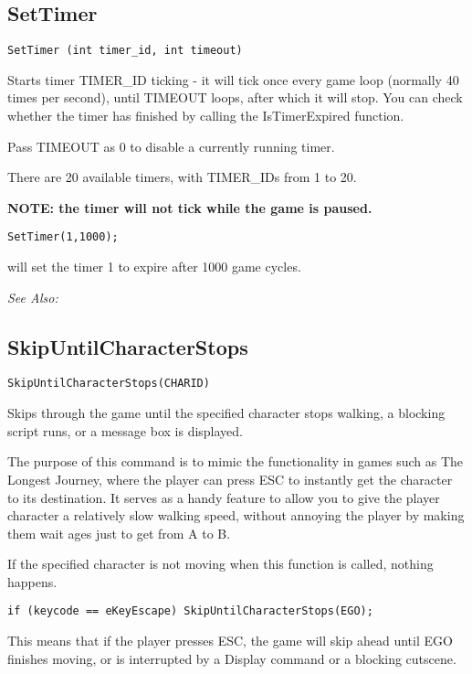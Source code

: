 \subsection{SetTimer}\label{SetTimer}%

\begin{verbatim}
SetTimer (int timer_id, int timeout)
\end{verbatim}
Starts timer TIMER_ID ticking - it will tick once every game loop (normally
40 times per second), until TIMEOUT loops, after which it will stop.
You can check whether the timer has finished by calling the IsTimerExpired
function.

Pass TIMEOUT as 0 to disable a currently running timer.

There are 20 available timers, with TIMER_IDs from 1 to 20.

\bf{NOTE:} the timer will not tick while the game is paused.

\begin{verbatim}
SetTimer(1,1000);
\end{verbatim}
will set the timer 1 to expire after 1000 game cycles.

\it{See Also:} 


\subsection{SkipUntilCharacterStops}\label{SkipUntilCharacterStops}%

\begin{verbatim}
SkipUntilCharacterStops(CHARID)
\end{verbatim}

Skips through the game until the specified character stops walking, a blocking
script runs, or a message box is displayed.

The purpose of this command is to mimic the functionality in games such as The Longest Journey,
where the player can press ESC to instantly get the character to its destination. It serves
as a handy feature to allow you to give the player character a relatively slow walking speed,
without annoying the player by making them wait ages just to get from A to B.

If the specified character is not moving when this function is called, nothing happens.

\begin{verbatim}
if (keycode == eKeyEscape) SkipUntilCharacterStops(EGO);
\end{verbatim}
This means that if the player presses ESC, the game will skip ahead until EGO finishes
moving, or is interrupted by a Display command or a blocking cutscene.

